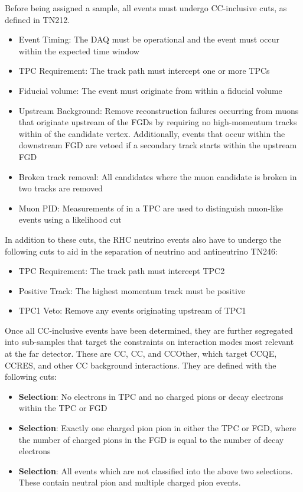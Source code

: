 Before being assigned a sample, all events must undergo CC-inclusive cuts, as defined in TN212.

\begin{itemize}
\item Event Timing: The DAQ must be operational and the event must occur within the expected time window
\item TPC Requirement: The track path must intercept one or more TPCs
\item Fiducial volume: The event must originate from within a fiducial volume
\item Upstream Background: Remove reconstruction failures occurring from muons that originate upstream of the FGDs by requiring no high-momentum tracks within  of the candidate vertex. Additionally, events that occur within the downstream FGD are vetoed if a secondary track starts within the upstream FGD
\item Broken track removal: All candidates where the muon candidate is broken in two tracks are removed
\item Muon PID: Measurements of  in a TPC are used to distinguish muon-like events using a likelihood cut
\end{itemize}

In addition to these cuts, the RHC neutrino events also have to undergo the following cuts to aid in the separation of neutrino and antineutrino TN246:

\begin{itemize}
\item TPC Requirement: The track path must intercept TPC2
\item Positive Track: The highest momentum track must be positive
\item TPC1 Veto: Remove any events originating upstream of TPC1
\end{itemize}

Once all CC-inclusive events have been determined, they are further segregated into sub-samples that target the constraints on interaction modes most relevant at the far detector. These are CC\quickmath{0\pi}, CC\quickmath{1\pi}, and CCOther, which target CCQE, CCRES, and other CC background interactions. They are defined with the following cuts:

\begin{itemize}
\item \textbf{ Selection}: No electrons in TPC and no charged pions or decay electrons within the TPC or FGD
\item \textbf{ Selection}: Exactly one charged pion pion in either the TPC or FGD, where the number of charged pions in the FGD is equal to the number of decay electrons
\item \textbf{ Selection}: All events which are not classified into the above two selections. These contain neutral pion and multiple charged pion events.
\end{itemize}

